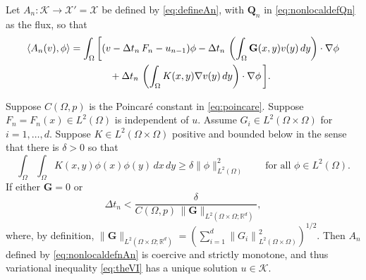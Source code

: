 \documentclass[final,onefignum]{siamart190516}
\newcommand\bG{\mathbf{G}}
\newcommand\bQ{\mathbf{Q}}
\newcommand{\grad}{\nabla}
\newcommand{\ip}[2]{\ensuremath{\left<#1,#2\right>}}
\newcommand\RR{\mathbb{R}}
\begin{document}
Let $A_n:\mathcal{K} \to \mathcal{X}'=\mathcal{X}$ be defined by \eqref{eq:defineAn}, with $\bQ_n$ in \eqref{eq:nonlocaldefQn} as the flux, so that
\begin{align}
    \ip{A_n(v)}{\phi} &= \int_\Omega \bigg[(v - \Delta t_n\,F_n - u_{n-1})\phi - \Delta t_n\,\left(\int_\Omega \bG(x,y) v(y)\,dy\right)\cdot \grad \phi \label{eq:nonlocaldefnAn} \\
                      &\qquad\qquad + \Delta t_n\,\left(\int_\Omega K(x,y) \grad v(y)\,dy\right)\cdot \grad \phi\,\bigg]. \notag
\end{align}

\begin{theorem}  \label{thm:nonlocalwellposed}  Suppose $C(\Omega,p)$ is the Poincar\'e constant in \eqref{eq:poincare}.  Suppose $F_n=F_n(x) \in L^2(\Omega)$ is independent of $u$.  Assume $G_i \in L^2(\Omega\times\Omega)$ for $i=1,\dots,d$.  Suppose $K \in L^2(\Omega\times\Omega)$ positive and bounded below \cite{PorterStirling1990} in the sense that there is $\delta>0$ so that
\begin{equation}
   \int_\Omega \int_\Omega K(x,y) \phi(x) \phi(y)\,dx\,dy \ge \delta \|\phi\|_{L^2(\Omega)}^2 \qquad \text{for all } \phi \in L^2(\Omega).  \label{eq:nonlocalKpos}
\end{equation}
If either $\bG=0$ or
\begin{equation}
  \Delta t_n < \frac{\delta}{C(\Omega,p)\, \|\bG\|_{L^2(\Omega\times\Omega;\RR^d)}},  \label{eq:nonlocaldtcond}
\end{equation}
where, by definition, $\|\bG\|_{L^2(\Omega\times\Omega;\RR^d)} = \left(\sum_{i=1}^d \left\|G_i\right\|_{L^2(\Omega \times \Omega)}^2\right)^{1/2}$.  Then $A_n$ defined by \eqref{eq:nonlocaldefnAn} is coercive and strictly monotone, and thus variational inequality \eqref{eq:theVI} has a unique solution $u\in\mathcal{K}$.
\end{theorem}
\end{document}
